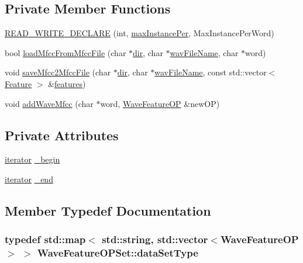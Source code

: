 \subsection*{Private Member Functions}
\begin{DoxyCompactItemize}
\item 
\hyperlink{class_wave_feature_o_p_set_a38cf383cb3013736235f794c002b2d0e}{R\+E\+A\+D\+\_\+\+W\+R\+I\+T\+E\+\_\+\+D\+E\+C\+L\+A\+R\+E} (int, \hyperlink{pro4__demo__1_8cpp_adc01d2f6980a1af5c3ddc83d847dafa0}{max\+Instance\+Per}, Max\+Instance\+Per\+Word)
\item 
bool \hyperlink{class_wave_feature_o_p_set_a95ae87c61c39c436f14c118855235c4e}{load\+Mfcc\+From\+Mfcc\+File} (char $\ast$\hyperlink{recorder_8cpp_a076467fbbccdf16ebbc375c94af4e31c}{dir}, char $\ast$\hyperlink{pro2__demo_8cpp_ad9a59c7128669a882a4be4fa879c41f7}{wav\+File\+Name}, char $\ast$word)
\item 
void \hyperlink{class_wave_feature_o_p_set_a2ab2d0184bf252ded921ae7e83d2b208}{save\+Mfcc2\+Mfcc\+File} (char $\ast$\hyperlink{recorder_8cpp_a076467fbbccdf16ebbc375c94af4e31c}{dir}, char $\ast$\hyperlink{pro2__demo_8cpp_ad9a59c7128669a882a4be4fa879c41f7}{wav\+File\+Name}, const std\+::vector$<$ \hyperlink{class_feature}{Feature} $>$ \&\hyperlink{lpc2cep_8m_afcc1d2df0288347ea10603033506e33b}{features})
\item 
void \hyperlink{class_wave_feature_o_p_set_a04d82b823563bf11b835fb61d73c4921}{add\+Wave\+Mfcc} (char $\ast$word, \hyperlink{class_wave_feature_o_p}{Wave\+Feature\+O\+P} \&new\+O\+P)
\end{DoxyCompactItemize}
\subsection*{Private Attributes}
\begin{DoxyCompactItemize}
\item 
\hyperlink{class_wave_feature_o_p_set_1_1iterator}{iterator} \hyperlink{class_wave_feature_o_p_set_aa827cacdbc67e23d46aa75e09d0a7c81}{\+\_\+begin}
\item 
\hyperlink{class_wave_feature_o_p_set_1_1iterator}{iterator} \hyperlink{class_wave_feature_o_p_set_a90181c57111ae23c2cfd00f8c3e738a1}{\+\_\+end}
\end{DoxyCompactItemize}


\subsection{Member Typedef Documentation}
\hypertarget{class_wave_feature_o_p_set_a7145e9463a1fb85ce4c239552bf4e8e0}{
\subsubsection[{data\+Set\+Type}]{\setlength{\rightskip}{0pt plus 5cm}typedef std\+::map$<$ std\+::string, std\+::vector$<${\bf Wave\+Feature\+O\+P}$>$ $>$ {\bf Wave\+Feature\+O\+P\+Set\+::data\+Set\+Type}}}\label{class_wave_feature_o_p_set_a7145e9463a1fb85ce4c239552bf4e8e0}


